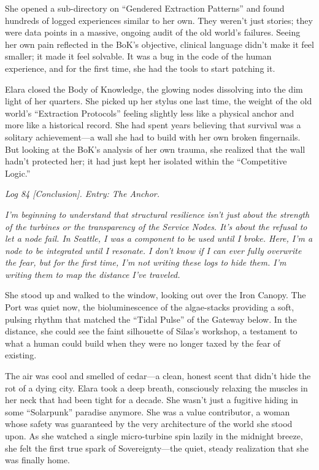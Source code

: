 She opened a sub-directory on ``Gendered Extraction Patterns'' and found hundreds of logged experiences similar to her own. They weren't just stories; they were data points in a massive, ongoing audit of the old world's failures. Seeing her own pain reflected in the BoK's objective, clinical language didn't make it feel smaller; it made it feel solvable. It was a bug in the code of the human experience, and for the first time, she had the tools to start patching it.


Elara closed the Body of Knowledge, the glowing nodes dissolving into the dim light of her quarters. She picked up her stylus one last time, the weight of the old world's ``Extraction Protocols'' feeling slightly less like a physical anchor and more like a historical record. She had spent years believing that survival was a solitary achievement—a wall she had to build with her own broken fingernails. But looking at the BoK's analysis of her own trauma, she realized that the wall hadn't protected her; it had just kept her isolated within the ``Competitive Logic.''

\textit{Log 84 [Conclusion]. Entry: The Anchor.}

\textit{I'm beginning to understand that structural resilience isn't just about the strength of the turbines or the transparency of the Service Nodes. It's about the refusal to let a node fail. In Seattle, I was a component to be used until I broke. Here, I'm a node to be integrated until I resonate. I don't know if I can ever fully overwrite the fear, but for the first time, I'm not writing these logs to hide them. I'm writing them to map the distance I've traveled.}

She stood up and walked to the window, looking out over the Iron Canopy. The Port was quiet now, the bioluminescence of the algae-stacks providing a soft, pulsing rhythm that matched the ``Tidal Pulse'' of the Gateway below. In the distance, she could see the faint silhouette of Silas's workshop, a testament to what a human could build when they were no longer taxed by the fear of existing. 

The air was cool and smelled of cedar—a clean, honest scent that didn't hide the rot of a dying city. Elara took a deep breath, consciously relaxing the muscles in her neck that had been tight for a decade. She wasn't just a fugitive hiding in some ``Solarpunk'' paradise anymore. She was a value contributor, a woman whose safety was guaranteed by the very architecture of the world she stood upon. As she watched a single micro-turbine spin lazily in the midnight breeze, she felt the first true spark of Sovereignty—the quiet, steady realization that she was finally home.
